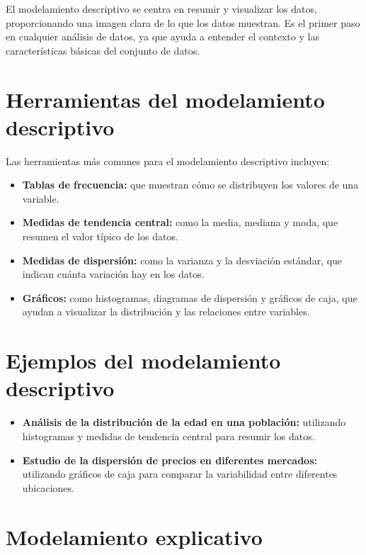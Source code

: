 \documentclass[
  letterpaper,
  DIV=11,
  numbers=noendperiod]{scrreprt}
\providecommand{\tightlist}{%
  \setlength{\itemsep}{0pt}\setlength{\parskip}{0pt}}\usepackage{longtable,booktabs,array}
\begin{document}
El modelamiento descriptivo se centra en resumir y visualizar los datos,
proporcionando una imagen clara de lo que los datos muestran. Es el
primer paso en cualquier análisis de datos, ya que ayuda a entender el
contexto y las características básicas del conjunto de datos.

\section{Herramientas del modelamiento
descriptivo}\label{herramientas-del-modelamiento-descriptivo}

Las herramientas más comunes para el modelamiento descriptivo incluyen:

\begin{itemize}
\tightlist
\item
  \textbf{Tablas de frecuencia:} que muestran cómo se distribuyen los
  valores de una variable.
\item
  \textbf{Medidas de tendencia central:} como la media, mediana y moda,
  que resumen el valor típico de los datos.
\item
  \textbf{Medidas de dispersión:} como la varianza y la desviación
  estándar, que indican cuánta variación hay en los datos.
\item
  \textbf{Gráficos:} como histogramas, diagramas de dispersión y
  gráficos de caja, que ayudan a visualizar la distribución y las
  relaciones entre variables.
\end{itemize}

\section{Ejemplos del modelamiento
descriptivo}\label{ejemplos-del-modelamiento-descriptivo}

\begin{itemize}
\tightlist
\item
  \textbf{Análisis de la distribución de la edad en una población:}
  utilizando histogramas y medidas de tendencia central para resumir los
  datos.
\item
  \textbf{Estudio de la dispersión de precios en diferentes mercados:}
  utilizando gráficos de caja para comparar la variabilidad entre
  diferentes ubicaciones.
\end{itemize}

\section{Modelamiento explicativo}\label{modelamiento-explicativo}
\end{document}
